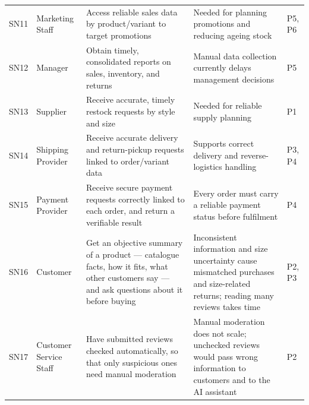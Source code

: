 \documentclass[11pt,a4paper,oneside]{extreport}
\newif\ifshowvtwo
\newcommand{\vtwocolor}{\ifshowvtwo\color{red}\fi}
\newcommand{\R}{\leavevmode\vtwocolor}   %
\begin{document}
\begin{xltabular}{\textwidth}{@{}l L{2.5cm} Y Y l@{}}
SN11 & Marketing Staff & Access reliable sales data by product/variant to target promotions & Needed for planning promotions and reducing ageing stock & P5, P6 \\ \addlinespace
SN12 & Manager & Obtain timely, consolidated reports on sales, inventory, and returns & Manual data collection currently delays management decisions & P5 \\ \addlinespace
SN13 & Supplier & Receive accurate, timely restock requests by style and size & Needed for reliable supply planning & P1 \\ \addlinespace
SN14 & Shipping Provider & Receive accurate delivery and return-pickup requests linked to order/variant data & Supports correct delivery and reverse-logistics handling & P3, P4 \\ \addlinespace
SN15 & Payment Provider & Receive secure payment requests correctly linked to each order, and return a verifiable result & Every order must carry a reliable payment status before fulfilment & P4 \\ \addlinespace
\R SN16 & \R Customer & \R Get an objective summary of a product --- catalogue facts, how it fits, what other customers say --- and ask questions about it before buying & \R Inconsistent information and size uncertainty cause mismatched purchases and size-related returns; reading many reviews takes time & \R P2, P3 \\ \addlinespace
\R SN17 & \R Customer Service Staff & \R Have submitted reviews checked automatically, so that only suspicious ones need manual moderation & \R Manual moderation does not scale; unchecked reviews would pass wrong information to customers and to the AI assistant & \R P2 \\
\end{xltabular}
\end{document}

